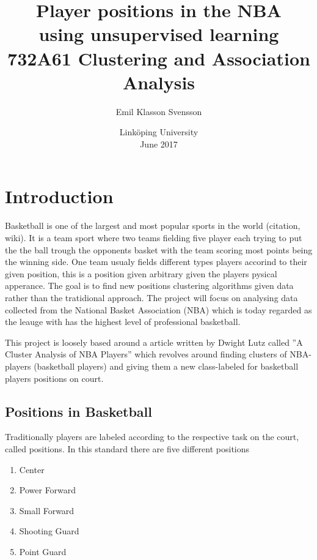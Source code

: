 \documentclass{article}
\title{Player positions in the NBA \\
using unsupervised learning \\ 
\large  732A61 Clustering and Association Analysis }
\author{Emil Klasson Svensson }
\date{Linköping University \\
June 2017}
\begin{document}
\maketitle

\newpage

\section{Introduction}

Basketball is one of the largest and most popular sports in the world (citation, wiki).  It is a team sport where two teams fielding five player each trying to put the the ball trough the opponents basket with the team scoring most points being the winning side. One team usualy fields different types players accorind to their given position, this is a position given arbitrary given the players pysical apperance.  The goal is to find new positions clustering algorithms given data rather than the tratidional approach. The project will focus on analysing data collected from the National Basket Association (NBA) which is today regarded as the leauge with has the highest level of professional basketball.

This project is  loosely based around a article written by Dwight Lutz called  ”A Cluster Analysis of NBA Players” which revolves around finding clusters of NBA-players (basketball players) and giving them a new class-labeled for basketball players positions on court.
 



\subsection{Positions in Basketball}

Traditionally players are labeled according to the respective task on the court, called positions. In this standard there are five different positions

\begin{enumerate}
\item Center 
\item Power Forward
\item Small Forward
\item Shooting Guard
\item Point Guard
\end{enumerate}
\end{document}
